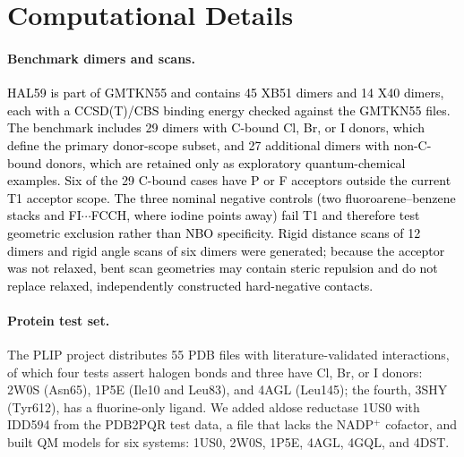 \documentclass[journal=jcisd8,manuscript=article,layout=two-column]{achemso}
\newcommand{\tcb}[1]{{\textcolor{black}{#1}}}
\begin{document}
\section{Computational Details}

\paragraph{Benchmark dimers and scans.}
\tcb{HAL59 is part of GMTKN55 and contains 45 XB51 dimers and 14 X40 dimers, each with a CCSD(T)/CBS binding energy checked against the GMTKN55 files. The benchmark includes 29 dimers with C-bound Cl, Br, or I donors, which define the primary donor-scope subset, and 27 additional dimers with non-C-bound donors, which are retained only as exploratory quantum-chemical examples. Six of the 29 C-bound cases have P or F acceptors outside the current T1 acceptor scope. The three nominal negative controls (two fluoroarene--benzene stacks and FI$\cdots$FCCH, where iodine points away) fail T1 and therefore test geometric exclusion rather than NBO specificity. Rigid distance scans of 12 dimers and rigid angle scans of six dimers were generated; because the acceptor was not relaxed, bent scan geometries may contain steric repulsion and do not replace relaxed, independently constructed hard-negative contacts.}

\paragraph{Protein test set.}
The PLIP project distributes 55 PDB files with literature-validated interactions,\cite{Adasme2021} of which four tests assert halogen bonds and three have Cl, Br, or I donors: 2W0S (Asn65),\cite{Caillat2008} 1P5E (Ile10 and Leu83),\cite{DeMoliner2003} and 4AGL (Leu145);\cite{Wilcken2012} the fourth, 3SHY (Tyr612),\cite{Xu2011} has a fluorine-only ligand. We added aldose reductase 1US0 with IDD594\cite{Howard2004} from the PDB2PQR test data, a file that lacks the NADP$^+$ cofactor, and built QM models for six systems: 1US0, 2W0S, 1P5E, 4AGL, 4GQL,\cite{Czarny2013} and 4DST.\cite{Maurer2012}
\end{document}
